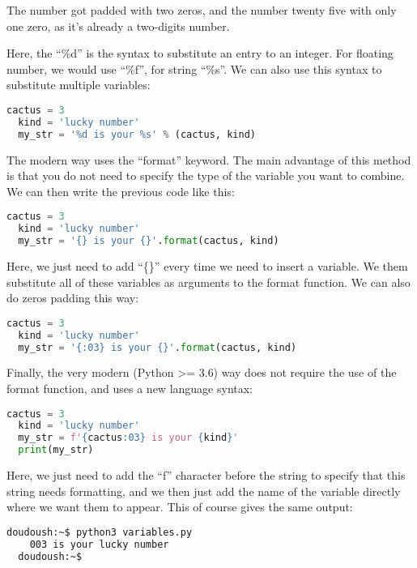 The number got padded with two zeros, and the number twenty five with only one zero,
as it's already a two-digits number.

\vspace{5mm}

Here, the ``\%d'' is the syntax to substitute an entry to an integer. For floating
number, we would use ``\%f'', for string ``\%s''. We can also use this syntax to
substitute multiple variables:

\begin{lstlisting}[language=python]
  cactus = 3
  kind = 'lucky number'
  my_str = '%d is your %s' % (cactus, kind)
\end{lstlisting}


The modern way uses the ``format'' keyword. The main advantage of this method is
that you do not need to specify the type of the variable you want to combine.
We can then write the previous code like this:

\begin{lstlisting}[language=python]
  cactus = 3
  kind = 'lucky number'
  my_str = '{} is your {}'.format(cactus, kind)
\end{lstlisting}

Here, we just need to add ``\{\}'' every time we need to insert a variable. We them
substitute all of these variables as arguments to the format function. We can also
do zeros padding this way:

\begin{lstlisting}[language=python]
  cactus = 3
  kind = 'lucky number'
  my_str = '{:03} is your {}'.format(cactus, kind)
\end{lstlisting}

Finally, the very modern (Python >= 3.6) way does not require the use of the format
function, and uses a new language syntax:

\begin{lstlisting}[language=python]
  cactus = 3
  kind = 'lucky number'
  my_str = f'{cactus:03} is your {kind}'
  print(my_str)
\end{lstlisting}

Here, we just need to add the ``f'' character before the string to specify that
this string needs formatting, and we then just add the name of the variable directly
where we want them to appear. This of course gives the same output:

\begin{lstlisting}[language=bash]
  doudoush:~$ python3 variables.py
    003 is your lucky number
  doudoush:~$
\end{lstlisting}

